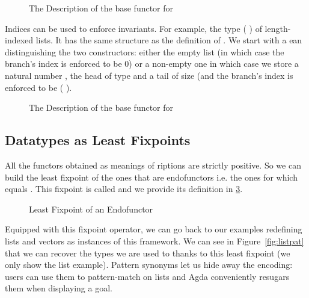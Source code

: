 \begin{figure}[h]
\caption{The Description of the base functor for ~}
\label{figure:listD}
\end{figure}

Indices can be used to enforce invariants. For example, the type
({  }) of length-indexed lists. It has the
same structure as the definition of .
We start with a ean distinguishing the two constructors: either
the empty list (in which case the branch's index is enforced to be $0$) or a
non-empty one in which case we store a natural number , the head of type
 and a tail of size  (and the branch's index is enforced to be
( ).

\begin{figure}[h]
\caption{The Description of the base functor for ~~}\label{figure:vecD}
\end{figure}

\subsection{Datatypes as Least Fixpoints}

All the functors obtained as meanings of riptions are strictly
positive. So we can build the least fixpoint of the ones that are
endofunctors i.e. the ones for which  equals . This fixpoint
is called  and we provide its definition in \cref{figure:datamu}.

\begin{figure}[h]
\caption{Least Fixpoint of an Endofunctor}\label{figure:datamu}
\end{figure}

Equipped with this fixpoint operator, we can go back to our examples
redefining lists and vectors as instances of this framework. We can
see in Figure~\ref{fig:listpat} that we can recover the types we are
used to thanks to this least fixpoint (we only show the list example).
%
Pattern synonyms let us hide away the encoding: users can use them
to pattern-match on lists and Agda conveniently resugars them when
displaying a goal.

